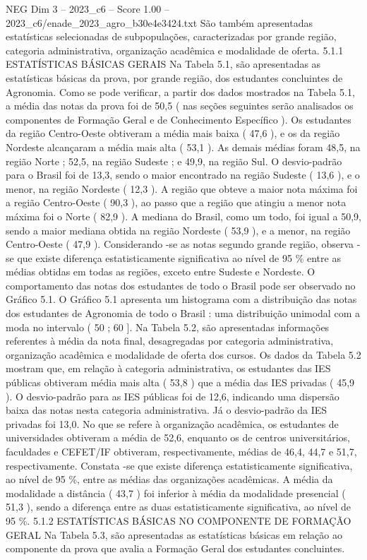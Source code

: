\begin{textsample}{NEG Dim 3 – 2023\_c6 – Score 1.00 – 2023\_c6/enade\_2023\_agro\_b30e4e3424.txt}
São também apresentadas estatísticas selecionadas de subpopulações, caracterizadas por grande região, categoria administrativa, organização acadêmica e modalidade de oferta. 5.1.1 ESTATÍSTICAS BÁSICAS GERAIS Na Tabela 5.1, são apresentadas as estatísticas básicas da prova, por grande região, dos estudantes concluintes de Agronomia.
Como se pode verificar, a partir dos dados mostrados na Tabela 5.1, a média das notas da prova foi de 50,5 ( nas seções seguintes serão analisados os componentes de Formação Geral e de Conhecimento Específico ).
Os estudantes da região Centro-Oeste obtiveram a média mais baixa ( 47,6 ), e os da região Nordeste alcançaram a média mais alta ( 53,1 ).
As demais médias foram 48,5, na região Norte ; 52,5, na região Sudeste ; e 49,9, na região Sul.
O desvio-padrão para o Brasil foi de 13,3, sendo o maior encontrado na região Sudeste ( 13,6 ), e o menor, na região Nordeste ( 12,3 ).
A região que obteve a maior nota máxima foi a região Centro-Oeste ( 90,3 ), ao passo que a região que atingiu a menor nota máxima foi o Norte ( 82,9 ).
A mediana do Brasil, como um todo, foi igual a 50,9, sendo a maior mediana obtida na região Nordeste ( 53,9 ), e a menor, na região Centro-Oeste ( 47,9 ).
Considerando -se as notas segundo grande região, observa -se que existe diferença estatisticamente significativa ao nível de 95 \% entre as médias obtidas em todas as regiões, exceto entre Sudeste e Nordeste.
O comportamento das notas dos estudantes de todo o Brasil pode ser observado no Gráfico 5.1.
O Gráfico 5.1 apresenta um histograma com a distribuição das notas dos estudantes de Agronomia de todo o Brasil : uma distribuição unimodal com a moda no intervalo ( 50 ; 60 ].
Na Tabela 5.2, são apresentadas informações referentes à média da nota final, desagregadas por categoria administrativa, organização acadêmica e modalidade de oferta dos cursos.
Os dados da Tabela 5.2 mostram que, em relação à categoria administrativa, os estudantes das IES públicas obtiveram média mais alta ( 53,8 ) que a média das IES privadas ( 45,9 ).
O desvio-padrão para as IES públicas foi de 12,6, indicando uma dispersão baixa das notas nesta categoria administrativa.
Já o desvio-padrão da IES privadas foi 13,0.
No que se refere à organização acadêmica, os estudantes de universidades obtiveram a média de 52,6, enquanto os de centros universitários, faculdades e CEFET/IF obtiveram, respectivamente, médias de 46,4, 44,7 e 51,7, respectivamente.
Constata -se que existe diferença estatisticamente significativa, ao nível de 95 \%, entre as médias das organizações acadêmicas.
A média da modalidade a distância ( 43,7 ) foi inferior à média da modalidade presencial ( 51,3 ), sendo a diferença entre as duas estatisticamente significativa, ao nível de 95 \%. 5.1.2 ESTATÍSTICAS BÁSICAS NO COMPONENTE DE FORMAÇÃO GERAL Na Tabela 5.3, são apresentadas as estatísticas básicas em relação ao componente da prova que avalia a Formação Geral dos estudantes concluintes.

\end{textsample}
